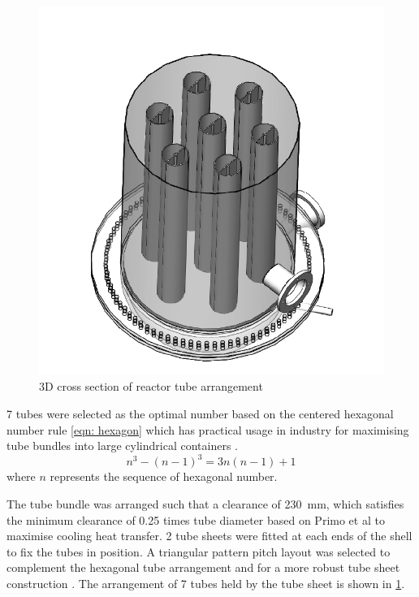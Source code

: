 \begin{figure}
    \centering
    \includegraphics[width=\linewidth]{chapters/2-reaction/figures/FYD reactor 7 tubes cross section 3D.PNG}
    \caption{3D cross section of reactor tube arrangement}
    \label{fig:reactortubearrangement}
\end{figure}
7 tubes were selected as the optimal number based on the centered hexagonal number rule \cref{eqn: hexagon} which has practical usage in industry for maximising tube bundles into large cylindrical containers \cite{noauthor_realiable_2018}. 
\begin{equation}
    n^3 - (n-1)^3 = 3n(n-1)+1
    \label{eqn: hexagon}
\end{equation}
where $n$ represents the sequence of hexagonal number. 

The tube bundle was arranged such that a clearance of \SI{230}{\milli \metre}, which satisfies the minimum clearance of 0.25 times tube diameter based on Primo et al \cite{primo_shell_2012} to maximise cooling heat transfer. 2 tube sheets were fitted at each ends of the shell to fix the tubes in position. A triangular pattern pitch layout was selected to complement the hexagonal tube arrangement and for a more robust tube sheet construction \cite{primo_shell_2012}. The arrangement of 7 tubes held by the tube sheet is shown in \cref{fig:reactortubearrangement}.

